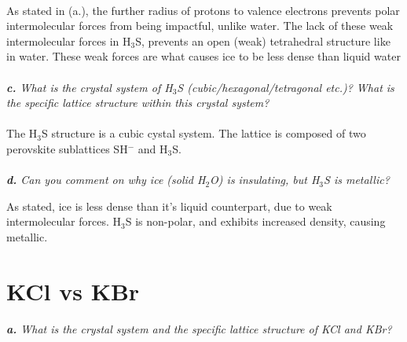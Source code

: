 \documentclass[letterpaper]{article}
\begin{document}
    \paragraph{}

    As stated in (a.), the further radius of protons to valence electrons prevents polar intermolecular forces from being impactful, unlike water.
    The lack of these weak intermolecular forces in H$_{3}$S, prevents an open (weak) tetrahedral structure like in water.
    These weak forces are what causes ice to be less dense than liquid water 


    \paragraph{}
    \textit{
        \textbf{c.} 
        What is the crystal system of H$_{3}$S (cubic/hexagonal/tetragonal etc.)? What is the specific lattice structure within this crystal system?
        }
    \paragraph{}

        The H$_{3}$S structure is a cubic cystal system. The lattice is composed of two perovskite sublattices SH$^{-}$ and H$_{3}$S.
        
    
    \paragraph{}
        \textit{
            \textbf{d.} 
            Can you comment on why ice (solid H$_{2}$O) is insulating, but H$_{3}$S is metallic?
            }

        As stated, ice is less dense than it's liquid counterpart, due to weak intermolecular forces.
        H$_{3}$S is non-polar, and exhibits increased density, causing metallic.

\section{KCl vs KBr}
    \paragraph{}
    \textit{
        \textbf{a.} 
        What is the crystal system and the specific lattice structure of KCl and KBr?
        }
    \paragraph{}
\end{document}
